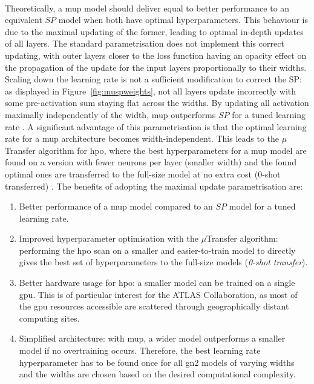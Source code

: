 \paragraph{}Theoretically, a \gls{mup} model should deliver equal to better performance to an equivalent $SP$ model when both have optimal hyperparameters. This behaviour is due to the maximal updating of the former, leading to optimal in-depth updates of all layers. The standard parametrisation does not implement this correct updating, with outer layers closer to the loss function having an opacity effect on the propagation of the update for the input layers proportionally to their widths. Scaling down the learning rate is not a sufficient modification to correct the SP: as displayed in Figure~\ref{fig:muspweights}, not all layers update incorrectly with some pre-activation sum staying flat across the widths. By updating all activation maximally independently of the width, \gls{mup} outperforms $SP$ for a tuned learning rate \cite{pmlr-v139-yang21c}. A significant advantage of this parametrisation is that the optimal learning rate for a \gls{mup} architecture becomes width-independent. This leads to the $\mu$Transfer algorithm for \gls{hpo}, where the best hyperparameters for a \gls{mup} model are found on a version with fewer neurons per layer (smaller width) and the found optimal ones are transferred to the full-size model at no extra cost (0-shot transferred) \cite{yang2021tuning}. The benefits of adopting the maximal update parametrisation are:
\begin{enumerate}
  \item Better performance of a \gls{mup} model compared to an $SP$ model for a tuned learning rate.
  \item Improved hyperparameter optimisation with the $\mu$Transfer algorithm: performing the \gls{hpo} scan on a smaller and easier-to-train model to directly gives the best set of hyperparameters to the full-size models (\textit{0-shot transfer}). 
  \item Better hardware usage for \gls{hpo}: a smaller model can be trained on a single \gls{gpu}. This is of particular interest for the ATLAS Collaboration, as most of the \gls{gpu} resources accessible are scattered through geographically distant computing sites.  
  \item Simplified architecture: with \gls{mup}, a wider model outperforms a smaller model if no overtraining occurs. Therefore, the best learning rate hyperparameter has to be found once for all \gls{gn2} models of varying widths and the widths are chosen based on the desired computational complexity.
\end{enumerate}

